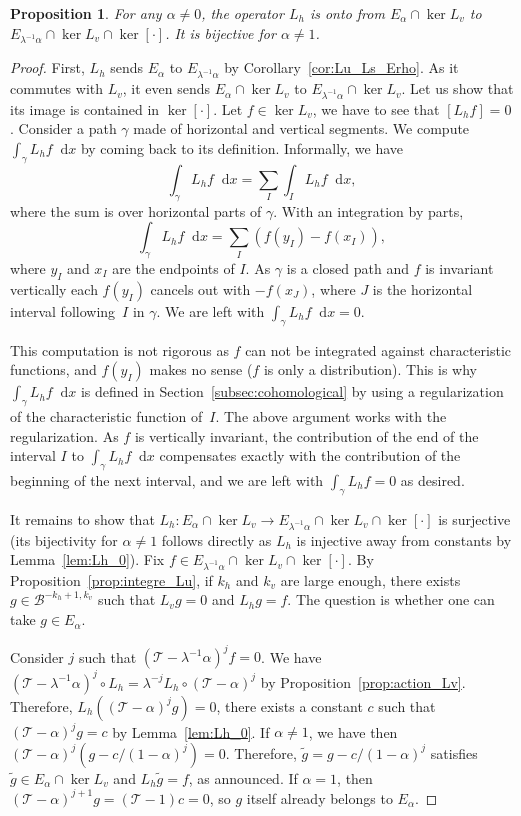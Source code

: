 \documentclass[10pt]{amsart}
\newcommand{\boB}{\mathcal{B}}
\newcommand{\boT}{\mathcal{T}}
\newcommand{\dd}{\mathop{}\!\mathrm{d}}
\newtheorem{prop}[thm]{Proposition}
\theoremstyle{definition}
\numberwithin{equation}{section}
\begin{document}
\begin{prop}
\label{prop:L_h_surj} For any $\alpha \neq 0$, the operator $L_h$ is onto
from $E_\alpha \cap \ker L_v$ to $E_{\lambda^{-1}\alpha} \cap \ker L_v \cap
\ker [\cdot]$. It is bijective for $\alpha \neq 1$.
\end{prop}
\begin{proof}
First, $L_h$ sends $E_\alpha$ to $E_{\lambda^{-1}\alpha}$ by
Corollary~\ref{cor:Lu_Ls_Erho}. As it commutes with $L_v$, it even sends
$E_\alpha \cap \ker L_v$ to $E_{\lambda^{-1}\alpha} \cap \ker L_v$. Let us
show that its image is contained in $\ker [\cdot]$. Let $f \in \ker L_v$, we
have to see that $[L_h f] = 0$. Consider a path $\gamma$ made of horizontal
and vertical segments. We compute $\int_\gamma L_h f \dd x$ by coming back to
its definition. Informally, we have
\[
\int_\gamma L_h f \dd x = \sum_I \int_I
L_h f \dd x,
\]
where the sum is over horizontal parts of $\gamma$. With an
integration by parts,
\[
\int_\gamma L_h f \dd x = \sum_I (f(y_I) - f(x_I)),
\]
where $y_I$ and $x_I$ are the endpoints of $I$. As $\gamma$ is a closed path
and $f$ is invariant vertically each $f(y_I)$ cancels out with $-f(x_J)$, where $J$ is the horizontal interval following~$I$ in $\gamma$. We are left
with $\int_\gamma L_h f \dd x = 0$.

This computation is not rigorous as $f$ can not be integrated against
characteristic functions, and $f(y_I)$ makes no sense ($f$ is only a
distribution). This is why $\int_\gamma L_h f \dd x$ is defined in
Section~\ref{subsec:cohomological} by using a regularization of the
characteristic function of~$I$. The above argument works with the
regularization. As $f$ is vertically invariant, the contribution of the end
of the interval $I$ to $\int_\gamma L_h f \dd x$ compensates exactly with the
contribution of the beginning of the next interval, and we are left with
$\int_\gamma L_h f = 0$ as desired.

It remains to show that $L_h : E_\alpha \cap \ker L_v \to
E_{\lambda^{-1}\alpha} \cap \ker L_v \cap \ker [\cdot]$ is surjective (its
bijectivity for $\alpha \neq 1$ follows directly as $L_h$ is injective away
from constants by Lemma~\ref{lem:Lh_0}). Fix $f \in E_{\lambda^{-1}\alpha}
\cap \ker L_v \cap \ker [\cdot]$. By Proposition~\ref{prop:integre_Lu}, if
$k_h$ and $k_v$ are large enough, there exists $g \in \boB^{-k_h+1, k_v}$
such that $L_v g = 0$ and $L_h g = f$. The question is whether one can take
$g \in E_\alpha$.

Consider $j$ such that $(\boT-\lambda^{-1}\alpha)^j f = 0$. We have
$(\boT-\lambda^{-1}\alpha)^j \circ L_h = \lambda^{-j} L_h \circ
(\boT-\alpha)^j$ by Proposition~\ref{prop:action_Lv}. Therefore, $L_h(
(\boT-\alpha)^j g) = 0$, \ie there exists a constant $c$ such that
$(\boT-\alpha)^j g = c$ by Lemma~\ref{lem:Lh_0}. If $\alpha \neq 1$, we have
then $(\boT-\alpha)^j (g - c/(1-\alpha)^j) = 0$. Therefore, $\tilde g = g -
c/(1-\alpha)^j$ satisfies $\tilde g \in E_\alpha \cap \ker L_v$ and $L_h
\tilde g = f$, as announced. If $\alpha = 1$, then $(\boT-\alpha)^{j+1} g =
(\boT - 1) c = 0$, so $g$ itself already belongs to $E_\alpha$.
\end{proof}
\end{document}
